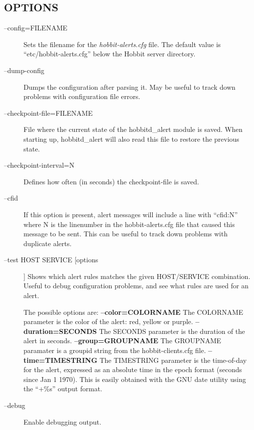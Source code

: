 \subsection{OPTIONS}
\begin{description}
\item[--config=FILENAME] Sets the filename for the \emph{hobbit-alerts.cfg}
 file. The default value is ``etc/hobbit-alerts.cfg'' below the Hobbit server directory. 

 

\item[--dump-config] Dumps the configuration after parsing it. May be
  useful to track down problems with configuration file errors. 


 

\item[--checkpoint-file=FILENAME] File where the current state of the
  hobbitd\_alert module is saved. When starting up, hobbitd\_alert
  will also read this file to restore the previous state. 


 

\item[--checkpoint-interval=N] Defines how often (in seconds) the checkpoint-file is saved. 

 

\item[--cfid] If this option is present, alert messages will include a
  line with ``cfid:N'' where N is the linenumber in the
  hobbit-alerts.cfg file that caused this message to be sent. This can
  be useful to track down problems with duplicate alerts. 


 

\item[--test HOST SERVICE [options]] Shows which alert rules matches
  the given HOST/SERVICE combination. Useful to debug configuration
  problems, and see what rules are used for an alert. 


  The possible options are:  
\textbf{--color=COLORNAME}
 The COLORNAME parameter is the color of the alert: red, yellow or purple.  
\textbf{--duration=SECONDS}
 The SECONDS parameter is the duration of the alert in seconds.  
\textbf{--group=GROUPNAME}
 The GROUPNAME paramater is a groupid string from the hobbit-clients.cfg file.  
\textbf{--time=TIMESTRING}
 The TIMESTRING parameter is the time-of-day for the alert, expressed
 as an absolute time in the epoch format (seconds since Jan 1
 1970). This is easily obtained with the GNU date utility using the
 ``+\%s'' output format. 



\item[--debug] Enable debugging output. 

 


\end{description}
